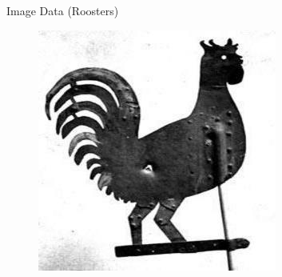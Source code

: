 \documentclass{beamer}
\begin{document}
\begin{frame}{Image Data (Roosters)}
\begin{figure}
    \includegraphics[scale=.35]{roosterrs-image_0004.jpg}
  \end{figure}
\end{frame}
\end{document}
